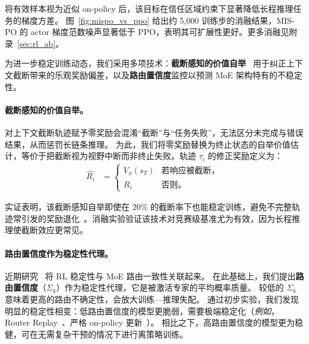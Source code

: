 将有效样本视为近似 on-policy 后，该目标在信任区域约束下显著降低长程推理任务的梯度方差。
图~\ref{fig:mispo_vs_ppo} 给出约 5,000 训练步的消融结果，MIS-PO 的 actor 梯度范数噪声显著低于 PPO，表明其可扩展性更好。更多消融见附录~\ref{sec:rl_ab}。

为进一步稳定训练动态，我们采用多项技术：\textbf{截断感知的价值自举}~\cite{pardo2022timelimitsreinforcementlearning} 用于纠正上下文截断带来的乐观奖励偏差，以及\textbf{路由置信度}监控以预测 MoE 架构特有的不稳定性。


\paragraph{截断感知的价值自举。}
对上下文截断轨迹赋予零奖励会混淆“截断”与“任务失败”，无法区分未完成与错误结果，从而惩罚长链条推理。
为此，我们将零奖励替换为终止状态的自举价值估计，等价于把截断视为视野中断而非终止失败。轨迹 $\tau_i$ 的修正奖励定义为：
\begin{align}
    \hat{R_i} &= \begin{cases} V_\phi(s_T) & \text{若响应被截断，} \\ R_i & \text{否则。} \end{cases}
\end{align}


实证表明，该截断感知自举即使在 20\% 的截断率下也能稳定训练，避免不完整轨迹常引发的奖励退化~\cite{deepscaler2025,yu2025dapo}。消融实验验证该技术对竞赛级基准尤为有效，因为长程推理使截断效应更常见。


\paragraph{路由置信度作为稳定性代理。}


近期研究~\cite{zheng2025group,ma2025stabilizing} 将 RL 稳定性与 MoE 路由一致性关联起来。
在此基础上，我们提出\textbf{路由置信度}（$\Sigma_k$）作为稳定性代理，它是被激活专家的平均概率质量。
较低的 $\Sigma_k$ 意味着更高的路由不确定性，会放大训练—推理失配。
通过初步实验，我们发现明显的稳定性相变：低路由置信度的模型更脆弱，需要极端稳定化（\textit{例如}，Router Replay~\cite{zheng2025group,ma2025stabilizing,deepseekai2024deepseekv32}、严格 on-policy 更新~\cite{hu2025openreasonerzero}）。
相比之下，高路由置信度的模型更为稳健，可在无需复杂干预的情况下进行离策略训练。


